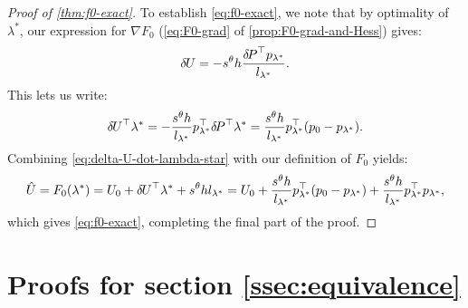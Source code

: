 \documentclass{article}
\begin{document}
\begin{proof}[Proof of \cref{thm:f0-exact}]
  To establish \cref{eq:f0-exact}, we note that by optimality of
  $\lambda^*$, our expression for $\nabla F_0$ (\cref{eq:F0-grad} of
  \cref{prop:F0-grad-and-Hess}) gives:
  \begin{equation}
    {\delta \hspace{-0.09em} U} = -s^\theta h \frac{{\delta \hspace{-0.14em} P}^\top p_{\lambda^*}}{l_{\lambda^*}}.
  \end{equation}
  This lets us write:
  \begin{equation}\label{eq:delta-U-dot-lambda-star}
    {\delta \hspace{-0.09em} U}^\top \lambda^* = -\frac{s^\theta h}{l_{\lambda^*}} p_{\lambda^*}^\top {\delta \hspace{-0.14em} P}^\top \lambda^* = \frac{s^\theta h}{l_{\lambda^*}} p_{\lambda^*}^\top {(p_0 - p_{\lambda^*})}.
  \end{equation}
  Combining \cref{eq:delta-U-dot-lambda-star} with our definition of
  $F_0$ yields:
  \begin{equation}
    \hat{U} = F_0(\lambda^*) = U_0 + {\delta \hspace{-0.09em} U}^\top \lambda^* + s^\theta h l_{\lambda^*} = U_0 + \frac{s^\theta h}{l_{\lambda^*}} p_{\lambda^*}^\top {(p_0 - p_{\lambda^*})} + \frac{s^\theta h}{l_{\lambda^*}} p_{\lambda^*}^\top p_{\lambda^*},
  \end{equation}
  which gives \cref{eq:f0-exact}, completing the final part of the
  proof.
\end{proof}

\section{Proofs for section
  \ref{ssec:equivalence}}\label{sec:equivalence-proofs}
\end{document}
